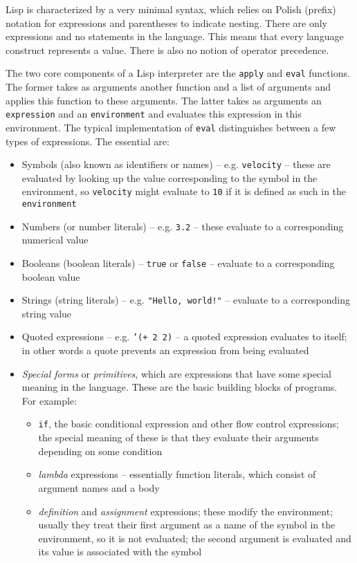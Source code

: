 Lisp is characterized by a very minimal syntax, which relies on Polish (prefix)
notation for expressions and parentheses to indicate nesting. There are only
expressions and no statements in the language. This means that every language
construct represents a value. There is also no notion of operator precedence.

The two core components of a Lisp interpreter are the \texttt{apply} and
\texttt{eval} functions\cite[Section~4.1]{sicp, c2_eval_apply}. The
former takes as arguments another function and a list of arguments and applies
this function to these arguments. The latter takes as arguments an
\texttt{expression} and an \texttt{environment} and evaluates this expression in
this environment. The typical implementation of \texttt{eval} distinguishes
between a few types of expressions. The essential are:
\begin{itemize}
	\item Symbols (also known as identifiers or names) --
          e.g. \texttt{velocity} -- these are evaluated by looking up the value
          corresponding to the symbol in the environment, so \texttt{velocity}
          might evaluate to \texttt{10} if it is defined as such in the
          \texttt{environment}
	\item Numbers (or number literals) -- e.g. \texttt{3.2} -- these
          evaluate to a corresponding numerical value
	\item Booleans (boolean literals) -- \texttt{true} or \texttt{false} --
          evaluate to a corresponding boolean value
	\item Strings (string literals) -- e.g. \texttt{"Hello, world!"} --
          evaluate to a corresponding string value
	\item Quoted expressions -- e.g. \texttt{'(+ 2 2)} -- a quoted
          expression evaluates to itself; in other words a quote prevents an
          expression from being evaluated
	\item \textit{Special forms} or \textit{primitives}, which are
          expressions that have some special meaning in the language. These are
          the basic building blocks of programs. For example:
	\begin{itemize}
		\item \texttt{if}, the basic conditional expression and other
                  flow control expressions; the special meaning of these is that
                  they evaluate their arguments depending on some condition
		\item \textit{lambda} expressions -- essentially function
                  literals, which consist of argument names and a body
		\item \textit{definition} and \textit{assignment} expressions;
                  these modify the environment; usually they treat their first
                  argument as a name of the symbol in the environment, so it is
                  not evaluated; the second argument is evaluated and its value
                  is associated with the symbol
	\end{itemize}
\end{itemize}

